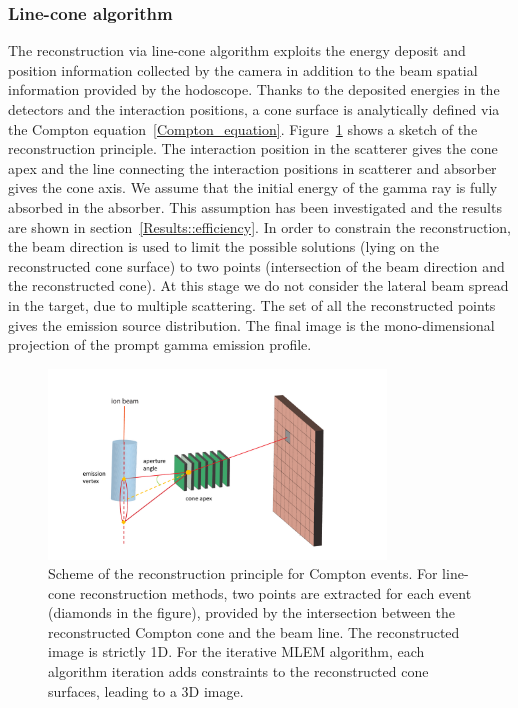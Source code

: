 \subsubsection{Line-cone algorithm}
The reconstruction via line-cone algorithm exploits the energy deposit and position information collected by the camera in addition to the beam spatial information provided by the hodoscope. Thanks to the deposited energies in the detectors and the interaction positions, a cone surface is analytically defined via the Compton equation~\ref{Compton_equation}. Figure~\ref{fig:reconstruction_scheme} shows a sketch of the reconstruction principle. The interaction position in the scatterer gives the cone apex and the line connecting the interaction positions in scatterer and absorber gives the cone axis. We assume that the initial energy of the gamma ray is fully absorbed in the absorber. This assumption has been investigated and the results are shown in section~\ref{Results::efficiency}. In order to constrain the reconstruction, the beam direction is used to limit the possible solutions (lying on the reconstructed cone surface) to two points (intersection of the beam direction and the reconstructed cone). At this stage we do not consider the lateral beam spread in the target, due to multiple scattering. The set of all the reconstructed points gives the emission source distribution. The final image is the mono-dimensional projection of the prompt gamma emission profile. 

\begin{figure}
\centering
  \includegraphics[width=0.8\textwidth]{./Figure/reconstruction_scheme}
  \caption{Scheme of the reconstruction principle for Compton events. For line-cone reconstruction methods, two points are extracted for each event (diamonds in the figure), provided by the intersection between the reconstructed Compton cone and the beam line. The reconstructed image is strictly 1D. For the iterative MLEM algorithm, each algorithm iteration adds constraints to the reconstructed cone surfaces, leading to  a 3D image.}	
  \label{fig:reconstruction_scheme}
\end{figure}

